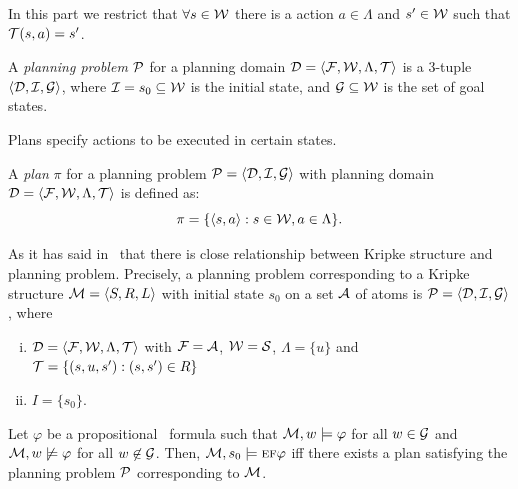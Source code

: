 \documentclass[letterpaper]{article} %
\begin{document}
In this part we restrict that $\forall s \in \cal W$ there is a action $a \in \Lambda$ and $s'\in \cal W$ such that ${\cal T}(s, a) = s'$.

A \emph{planning problem} $\cal P$ for a planning domain ${\cal D} ={\langle{{\cal F}, {\cal W}, \Lambda, \cal T}\rangle}$ is a 3-tuple ${\langle{\cal D, \cal I, \cal G}\rangle}$, where ${\cal I} = {s_0} \subseteq \cal W$ is the initial state, and $\cal G \subseteq W$ is the set of goal states.

Plans specify actions to be executed in certain states.
\begin{definition}[Plan]\label{pro:plan}
 A \emph{plan} $\pi$ for a planning problem $\cal P = {\langle{\cal D, \cal I, \cal G}\rangle}$ with planning domain ${\cal D} ={\langle{{\cal F}, {\cal W}, \Lambda, \cal T}\rangle}$ is defined as:
 \[
    \pi=\{{\langle{s,a}\rangle}:s \in {\cal W}, a\in \Lambda\}.
 \]
 \end{definition}

 As it has said in~\cite{giunchiglia1999planning} that there is close relationship between Kripke structure and planning problem.
 Precisely, a planning problem corresponding to a Kripke structure
 ${\cal M} = {\langle{S, R, L}\rangle}$ with initial state $s_0$ on a set $\cal A$ of atoms is $\cal P = {\langle{\cal D, \cal I, \cal G}\rangle}$, where
 \begin{enumerate}[(i)]
   \item ${\cal D} ={\langle{{\cal F}, {\cal W}, \Lambda, \cal T}\rangle}$ with $\cal F = \cal A$, $\cal W =  S$, $\Lambda =\{u\}$ and ${\cal T} = \{(s, u, s') : (s, s') \in R\}$
   \item $I = \{s_0\}$.
 \end{enumerate}

    Let $\varphi$ be a propositional \CTL\ formula such that ${\cal M}, w \models \varphi$ for all $w \in \cal G$ and ${\cal M}, w \not \models \varphi$ for all $w \not \in \cal G$. Then, ${\cal M}, s_0 \models \textsc{e} \textsc{f} \varphi$ iff there exists a plan satisfying the planning problem $\cal P$ corresponding to ${\cal M}$.
\end{document}
